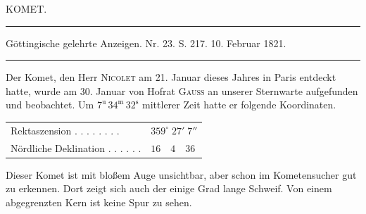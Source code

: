 \clearpage
{}
\hypertarget{native-440-part-lower}{}
\begin{center}
{\large KOMET.}
\end{center}

\begin{center}
\noindent\rule{\linewidth}{0.4pt}

Göttingische gelehrte Anzeigen. Nr. 23. S. 217. 10. Februar 1821.

\noindent\rule{\linewidth}{0.4pt}
\end{center}

Der Komet, den Herr \textsc{Nicolet} am 21. Januar dieses Jahres in Paris entdeckt hatte, wurde am 30. Januar von Hofrat \textsc{Gauss} an unserer Sternwarte aufgefunden und beobachtet. Um $7^{\mathrm{u}}\,34^{\mathrm{m}}\,32^{\mathrm{s}}$ mittlerer Zeit hatte er folgende Koordinaten.

\begin{center}
\begin{tabular}{ll}
Rektaszension . . . . . . . . & $359^\circ\;27'\;7''$ \\
Nördliche Deklination . . . . . . & $16\quad4\quad36$ \\
\end{tabular}
\end{center}

Dieser Komet ist mit bloßem Auge unsichtbar, aber schon im Kometensucher gut zu erkennen. Dort zeigt sich auch der einige Grad lange Schweif. Von einem abgegrenzten Kern ist keine Spur zu sehen.
